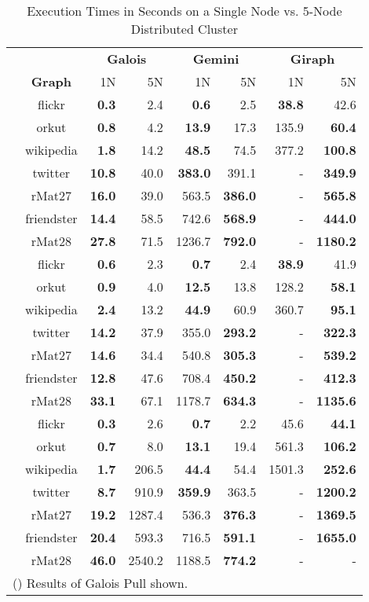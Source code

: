 \begin{table}
	\caption{Execution Times in Seconds on a Single Node vs. 5-Node Distributed Cluster}
	\label{tbl:execTimeComparison}
	\renewcommand{\arraystretch}{1.2}
	\centering
	\begin{tabular}{ccr@{\tabskip 1 \tabcolsep}r
	r@{\tabskip 1 \tabcolsep}r
	r@{\tabskip 1 \tabcolsep}r}
		\toprule
		&&\multicolumn{2}{c}{\bf Galois}&\multicolumn{2}{c}{\bf Gemini}&\multicolumn{2}{c}{\bf Giraph}\\
		\cmidrule{3-4}\cmidrule{5-6}\cmidrule{7-8}
		&\bf Graph&1N&5N&1N&5N&1N&5N\\
		\midrule
		\multirow{7}{0.5ex}{\rotatebox{90}{\bf SSSP}}&flickr & \bf 0.3 & 2.4 & \bf 0.6 & 2.5 & \bf 38.8 & 42.6 \\
		& orkut & \bf 0.8 & 4.2 & \bf 13.9 & 17.3 & 135.9 & \bf 60.4 \\
		& wikipedia & \bf 1.8 & 14.2 & \bf 48.5 & 74.5 & 377.2 & \bf 100.8 \\
		& twitter & \bf 10.8 & 40.0 & \bf 383.0 & 391.1 & - & \bf 349.9 \\
		& rMat27 & \bf 16.0 & 39.0 & 563.5 & \bf 386.0 & - & \bf 565.8 \\
		& friendster & \bf 14.4 & 58.5 & 742.6 & \bf 568.9 & - & \bf 444.0 \\
		& rMat28 & \bf 27.8 & 71.5 & 1236.7 & \bf 792.0 & - & \bf 1180.2 \\
		\midrule
		\multirow{7}{0.5ex}{\rotatebox{90}{\bf BFS}}& flickr & \bf 0.6 & 2.3 & \bf 0.7 & 2.4 & \bf 38.9 & 41.9 \\
		& orkut & \bf 0.9 & 4.0 & \bf 12.5 & 13.8 & 128.2 & \bf 58.1 \\
		& wikipedia & \bf 2.4 & 13.2 & \bf 44.9 & 60.9 & 360.7 & \bf 95.1 \\
		& twitter & \bf 14.2 & 37.9 & 355.0 & \bf 293.2 & - & \bf 322.3 \\
		& rMat27 & \bf 14.6 & 34.4 & 540.8 & \bf 305.3 & - & \bf 539.2 \\
		& friendster & \bf 12.8 & 47.6 & 708.4 & \bf 450.2 & - & \bf 412.3 \\
		& rMat28 & \bf 33.1 & 67.1 & 1178.7 & \bf 634.3 & - & \bf 1135.6 \\
		\midrule
		\multirow{7}{0.5ex}{\rotatebox{90}{\bf PR}}& flickr & \bf 0.3\txtdagger & 2.6 & \bf 0.7 & 2.2 & 45.6 & \bf 44.1 \\
		& orkut & \bf 0.7\txtdagger & 8.0 & \bf 13.1 & 19.4 & 561.3 & \bf 106.2 \\
		& wikipedia & \bf 1.7\txtdagger & 206.5 & \bf 44.4 & 54.4 & 1501.3 & \bf 252.6 \\
		& twitter & \bf 8.7\txtdagger & 910.9 & \bf 359.9 & 363.5 & - & \bf 1200.2 \\
		& rMat27 & \bf 19.2\txtdagger & 1287.4 & 536.3 & \bf 376.3 & - & \bf 1369.5 \\
		& friendster & \bf 20.4\txtdagger & 593.3 & 716.5 & \bf 591.1 & - & \bf 1655.0 \\
		& rMat28 & \bf 46.0\txtdagger & 2540.2 & 1188.5 & \bf 774.2 & - & - \\
		\bottomrule
		\multicolumn{8}{l}{(\txtdagger) Results of Galois Pull shown.}
	\end{tabular}
\end{table}
